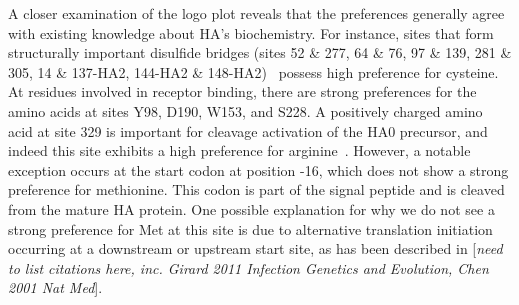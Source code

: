 \documentclass[11pt]{article}
\newcommand{\comment}[1]{{\color{red}[\textsl{#1}]}}
\begin{document}
A closer examination of the logo plot reveals that the preferences generally agree with existing knowledge about HA's biochemistry.
For instance, sites that form structurally important disulfide bridges (sites 52 \& 277, 64 \& 76, 97 \& 139, 281 \& 305, 14 \& 137-HA2, 144-HA2 \& 148-HA2)~\citep{waterfield1981disulphide} possess high preference for cysteine.
At residues involved in receptor binding, there are strong preferences for the amino acids at sites Y98, D190, W153, and S228.
A positively charged amino acid at site 329 is important for cleavage activation of the HA0 precursor, and indeed this site exhibits a high preference for arginine~\citep{kido1992isolation, stech2005new}.
However, a notable exception occurs at the start codon at position -16, which does not show a strong preference for methionine. 
This codon is part of the signal peptide and is cleaved from the mature HA protein.
One possible explanation for why we do not see a strong preference for Met at this site is due to alternative translation initiation occurring at a downstream or upstream start site, as has been described in \comment{need to list citations here, inc. Girard 2011 Infection Genetics and Evolution, Chen 2001 Nat Med}.
\end{document}
